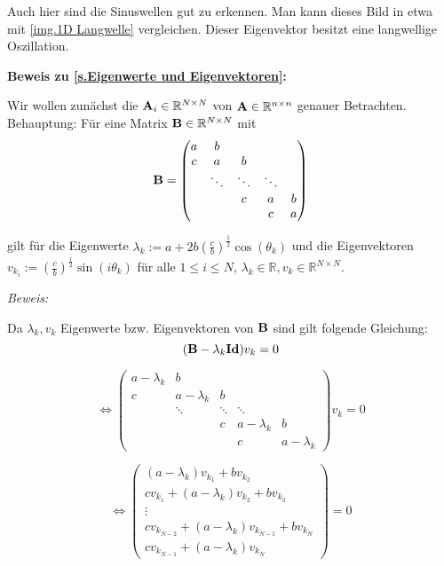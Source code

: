 Auch hier sind die Sinuswellen gut zu erkennen. Man kann dieses Bild in etwa mit \autoref{img.1D Langwelle} vergleichen. Dieser Eigenvektor besitzt eine langwellige Oszillation.

\textbf{Beweis zu \autoref{s.Eigenwerte und Eigenvektoren}:}

Wir wollen zunächst die ${\textbf{A}}_{i} \in \mathbb{R}^{N \times N}$ von ${\textbf{A}} \in \mathbb{R}^{n \times n}$ genauer Betrachten.\\
Behauptung: Für eine Matrix ${\textbf{B}} \in \mathbb{R}^{N \times N}$ mit
\begin{equation}
{\textbf{B}} = 
\begin{pmatrix}
a & b\\
c & a & b\\
  & \ddots & \ddots & \ddots\\
  &		   & c & a & b\\
  &		   &  & c & a
\end{pmatrix}
\end{equation}

gilt für die Eigenwerte $\lambda_{k} := a + 2b\left(\frac{c}{b}\right)^{\frac{1}{2}} \cos(\theta_{k})$ und die Eigenvektoren $v_{k_{i}} := \left(\frac{c}{b}\right)^{\frac{i}{2}} \sin(i \theta_{k})$ für alle $1 \le i \le N$, $\lambda_{k} \in \mathbb{R}, v_{k} \in \mathbb{R}^{N \times N}$.

\textit{Beweis:}

Da $\lambda_{k}, v_{k}$ Eigenwerte bzw. Eigenvektoren von ${\textbf{B}}$ sind gilt folgende Gleichung:
\begin{equation}
({\textbf{B}} - \lambda_{k} {\textbf{Id}}) v_{k} = 0
\end{equation}

\begin{equation}
\Longleftrightarrow
\begin{pmatrix}
a - \lambda_{k} & b\\
c & a - \lambda_{k} & b\\
  & \ddots & \ddots & \ddots\\
  &		   & c & a - \lambda_{k} & b\\
  &		   &  & c & a - \lambda_{k}
\end{pmatrix}
v_{k} = 0
\end{equation}

\begin{equation}
\Longleftrightarrow
\begin{pmatrix}
(a - \lambda_{k}) v_{k_{1}} + b v_{k_{2}}\\
c v_{k_{1}} + (a - \lambda_{k}) v_{k_{2}} + b v_{k_{3}}\\
\vdots\\
c v_{k_{N-2}} + (a - \lambda_{k}) v_{k_{N-1}} + b v_{k_{N}}\\
c v_{k_{N-1}} + (a - \lambda_{k}) v_{k_{N}}
\end{pmatrix}
= 0
\end{equation}

